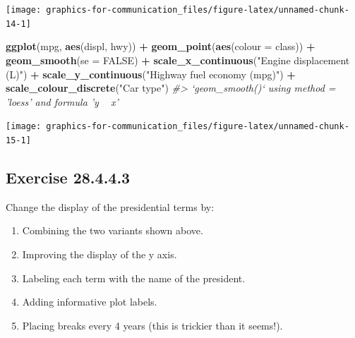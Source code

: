\documentclass[]{book}
\newenvironment{Shaded}{\begin{snugshade}}{\end{snugshade}}
\newcommand{\CommentTok}[1]{\textcolor[rgb]{0.56,0.35,0.01}{\textit{#1}}}
\newcommand{\DataTypeTok}[1]{\textcolor[rgb]{0.13,0.29,0.53}{#1}}
\newcommand{\KeywordTok}[1]{\textcolor[rgb]{0.13,0.29,0.53}{\textbf{#1}}}
\newcommand{\NormalTok}[1]{#1}
\newcommand{\OperatorTok}[1]{\textcolor[rgb]{0.81,0.36,0.00}{\textbf{#1}}}
\newcommand{\OtherTok}[1]{\textcolor[rgb]{0.56,0.35,0.01}{#1}}
\newcommand{\StringTok}[1]{\textcolor[rgb]{0.31,0.60,0.02}{#1}}
\providecommand{\tightlist}{%
  \setlength{\itemsep}{0pt}\setlength{\parskip}{0pt}}
\theoremstyle{plain}
\theoremstyle{remark}
\begin{document}
\begin{center}\texttt{[image: graphics-for-communication\_files/figure-latex/unnamed-chunk-14-1]} \end{center}

\begin{Shaded}
\begin{Highlighting}[]
\KeywordTok{ggplot}\NormalTok{(mpg, }\KeywordTok{aes}\NormalTok{(displ, hwy)) }\OperatorTok{+}
\StringTok{  }\KeywordTok{geom_point}\NormalTok{(}\KeywordTok{aes}\NormalTok{(}\DataTypeTok{colour =}\NormalTok{ class)) }\OperatorTok{+}
\StringTok{  }\KeywordTok{geom_smooth}\NormalTok{(}\DataTypeTok{se =} \OtherTok{FALSE}\NormalTok{) }\OperatorTok{+}
\StringTok{  }\KeywordTok{scale_x_continuous}\NormalTok{(}\StringTok{"Engine displacement (L)"}\NormalTok{) }\OperatorTok{+}
\StringTok{  }\KeywordTok{scale_y_continuous}\NormalTok{(}\StringTok{"Highway fuel economy (mpg)"}\NormalTok{) }\OperatorTok{+}
\StringTok{  }\KeywordTok{scale_colour_discrete}\NormalTok{(}\StringTok{"Car type"}\NormalTok{)}
\CommentTok{#> `geom_smooth()` using method = 'loess' and formula 'y ~ x'}
\end{Highlighting}
\end{Shaded}

\begin{center}\texttt{[image: graphics-for-communication\_files/figure-latex/unnamed-chunk-15-1]} \end{center}

\hypertarget{exercise-28.4.4.3}{%
\subsection*{\texorpdfstring{Exercise {28.4.4.3}}{Exercise 28.4.4.3}}\label{exercise-28.4.4.3}}

Change the display of the presidential terms by:

\begin{enumerate}
\def\labelenumi{\arabic{enumi}.}
\tightlist
\item
  Combining the two variants shown above.
\item
  Improving the display of the y axis.
\item
  Labeling each term with the name of the president.
\item
  Adding informative plot labels.
\item
  Placing breaks every 4 years (this is trickier than it seems!).
\end{enumerate}
\end{document}
